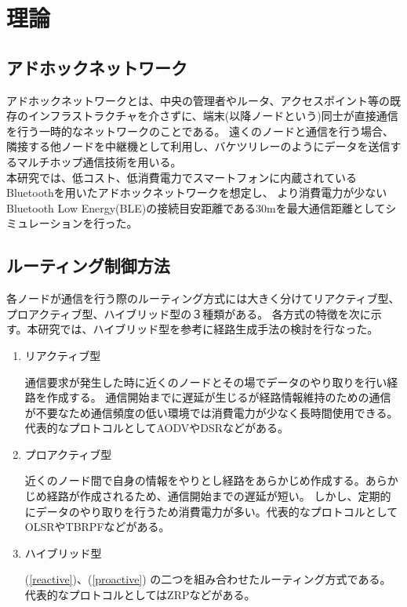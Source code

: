 \documentclass[a4paper, 9pt]{ltjsarticle}
\begin{document}


\section{理論} \label{label:theory}
\subsection{アドホックネットワーク} \label{sublabel:about ad-hoc network}
アドホックネットワークとは、中央の管理者やルータ、アクセスポイント等の既存のインフラストラクチャを介さずに、端末(以降ノードという)同士が直接通信を行う一時的なネットワークのことである。
遠くのノードと通信を行う場合、隣接する他ノードを中継機として利用し、バケツリレーのようにデータを送信するマルチホップ通信技術を用いる。%
\\ \indent 本研究では、低コスト、低消費電力でスマートフォンに内蔵されているBluetoothを用いたアドホックネットワークを想定し、
より消費電力が少ないBluetooth Low Energy(BLE)の接続目安距離である30mを最大通信距離としてシミュレーションを行った。

\subsection{ルーティング制御方法} \label{sublabel:routing control}
各ノードが通信を行う際のルーティング方式には大きく分けてリアクティブ型、プロアクティブ型、ハイブリッド型の３種類がある。
各方式の特徴を次に示す。本研究では、ハイブリッド型を参考に経路生成手法の検討を行なった。
\begin{enumerate}
  \item \label{reactive} リアクティブ型 \par  
  \indent 通信要求が発生した時に近くのノードとその場でデータのやり取りを行い経路を作成する。
  通信開始までに遅延が生じるが経路情報維持のための通信が不要なため通信頻度の低い環境では消費電力が少なく長時間使用できる。
  代表的なプロトコルとしてAODVやDSRなどがある。

  \item \label{proactive} プロアクティブ型 \par
  \indent 近くのノード間で自身の情報をやりとし経路をあらかじめ作成する。あらかじめ経路が作成されるため、通信開始までの遅延が短い。  
  しかし、定期的にデータのやり取りを行うため消費電力が多い。代表的なプロトコルとしてOLSRやTBRPFなどがある。

  \item ハイブリッド型 \par
  \indent (\ref{reactive})、(\ref{proactive}) の二つを組み合わせたルーティング方式である。代表的なプロトコルとしてはZRPなどがある。
\end{enumerate}
\end{document}
